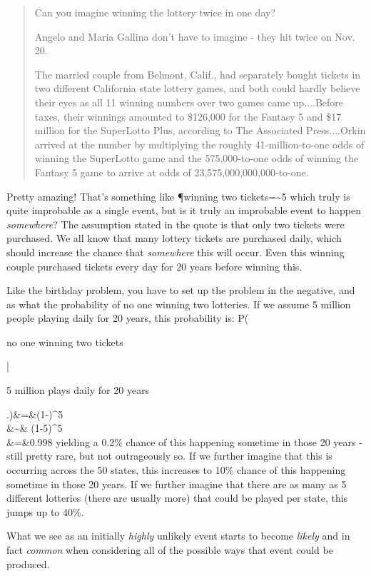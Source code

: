 \begin{quote}
Can you imagine winning the lottery twice in one day?

Angelo and Maria Gallina don't have to imagine - they hit twice on Nov. 20.

The married couple from Belmont, Calif., had separately bought tickets in two different California state lottery games, and both could hardly believe their eyes as all 11 winning numbers over two games came up....Before taxes, their winnings amounted to \$126,000 for the Fantasy 5 and \$17 million for the SuperLotto Plus, according to The Associated Press....Orkin arrived at the number by multiplying the roughly 41-million-to-one odds of winning the SuperLotto game and the 575,000-to-one odds of winning the Fantasy 5 game to arrive at odds of 23,575,000,000,000-to-one.
\end{quote}

Pretty amazing!  That's something like
\beq
\P{winning two tickets}=\sim 5
\eeq
which truly is quite improbable as a single event, but is it truly an improbable event to happen \emph{somewhere}?  The assumption stated in the quote is that only two tickets were purchased.  We all know that many lottery tickets are purchased daily, which should increase the chance that \emph{somewhere} this will occur.  Even this winning couple purchased tickets every day for 20 years before winning this.

Like the birthday problem, you have to set up the problem in the negative, and as what the probability of no one winning two lotteries.  If we assume 5 million people playing daily for 20 years, this probability is:
\beq
P\left(\parbox{.7in}{no one winning two tickets}\left|\parbox{.7in}{5 million plays daily for 20 years}\right.\right)&=&\left(1-\right)^{5 }\\
 \nn&\sim& (1-5)^{5 }\\
&=&0.998
\eeq
yielding a 0.2\% chance of this happening sometime in those 20 years - still pretty rare, but not outrageously so.  If we further imagine that this is occurring across the 50 states, this increases to 10\% chance of this happening sometime in those 20 years.  If we further imagine that there are as many as 5 different lotteries (there are usually more) that could be played per state, this jumps up to 40\%.

What we see as an initially \emph{highly} unlikely event starts to become \emph{likely} and in fact \emph{common} when considering all of the possible ways that event could be produced.



